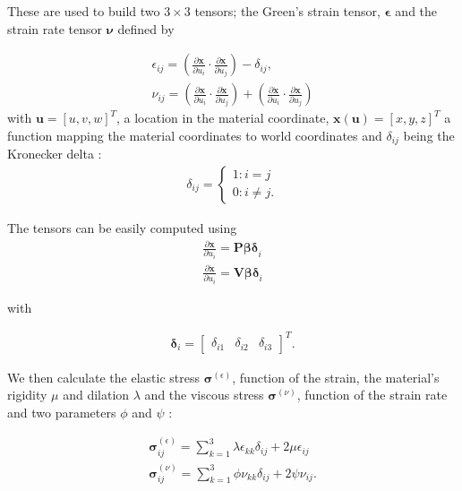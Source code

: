 \documentclass[tog]{acmsiggraph}
\begin{document}
These are used to build two $3 \times 3$ tensors; the Green's strain tensor, $\pmb{\epsilon}$ and the strain rate tensor $\pmb{\nu}$ defined by 

\begin{gather}
\epsilon_{ij} = \left(\frac{\partial \pmb{x}}{\partial u_i} \cdot \frac{\partial \pmb{x}}{\partial u_j}\right) - \delta_{ij}, \\
\nu_{ij} = \left(\frac{\partial \pmb{x}}{\partial u_i} \cdot \frac{\partial \pmb{\dot{x}}}{\partial u_j}\right) +  \left(\frac{\partial \pmb{\dot{x}}}{\partial u_i} \cdot \frac{\partial \pmb{x}}{\partial u_j}\right)
\end{gather}
with $\pmb{u} = [u, v, w]^T$, a location in the material coordinate, $\pmb{x(u)} = [x,y,z]^T$ a function mapping the material coordinates to world coordinates and $\delta_{ij}$ being the Kronecker delta : 
\begin{gather}
\delta_{ij} = \begin{cases} 
1 : i = j\\
0 : i \neq j.
\end{cases}
\end{gather}

The tensors can be easily computed using 
\begin{gather}
\frac{\partial \pmb{x}}{\partial u_i} = \pmb{P \beta \delta}_i\\
\frac{\partial \pmb{\dot{x}}}{\partial u_i} = \pmb{V \beta \delta}_i
\end{gather}

with

\begin{gather}
\pmb{\delta}_i = [\begin{matrix}
\delta_{i1} & \delta_{i2} & \delta_{i3}
\end{matrix}]^T.
\end{gather}

We then calculate the elastic stress $\pmb{\sigma}^{(\epsilon)}$, function of the strain, the material's rigidity $\mu$ and dilation $\lambda$ and the viscous stress $\pmb{\sigma}^{(\nu)}$, function of the strain rate and two parameters $\phi$ and $\psi$ :

\begin{gather}
\pmb{\sigma}_{ij}^{(\epsilon)} = \sum_{k =1}^3 \lambda \epsilon_{kk} \delta_{ij} + 2\mu \epsilon_{ij}\\
\pmb{\sigma}_{ij}^{(\nu)} = \sum_{k =1}^3 \phi \nu_{kk} \delta_{ij} + 2\psi \nu_{ij}.
\end{gather} 
\end{document}
